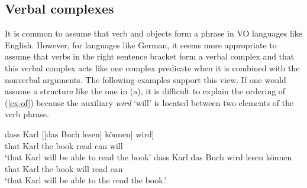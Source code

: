 \subsection{Verbal complexes}
\label{sec-vc-phen}

It is common to assume that verb and objects form a phrase in VO languages like English. However,
for languages like German, it seems more appropriate to assume that verbs in the right sentence
bracket form a verbal complex and that this verbal complex acts like one complex predicate when it
is combined with the nonverbal arguments. The following examples support this view. If one would
assume a structure like the one in (a), it is difficult to explain the ordering of
(\ref{ex-of}) because the auxiliary \emph{wird} `will' is located between two elements
of the verb phrase.

\eal
\ex
\label{ex-uf}
\gll dass Karl [[das Buch lesen] können] wird]\\
     that Karl \hspaceThis{[[}the book read can will\\
\glt `that Karl will be able to read the book'
\ex
\label{ex-of}
\gll dass Karl das Buch wird lesen können\\
     that Karl the book will read can\\
\glt `that Karl will be able to the read the book.'
\zl

